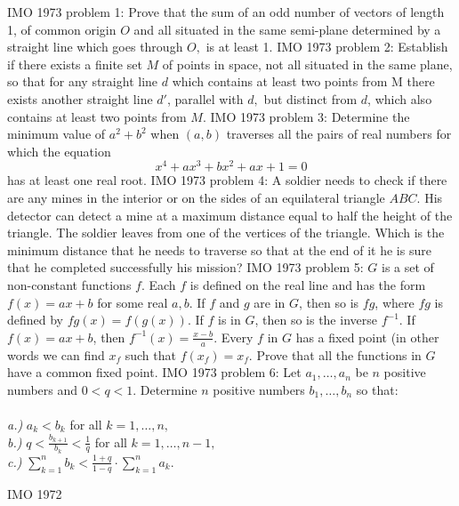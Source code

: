 IMO 1973 problem 1:  Prove that the sum of an odd number of vectors of length 1, of common origin $O$ and all situated in the same semi-plane determined by a straight line which goes through $O,$ is at least 1. 
IMO 1973 problem 2:  Establish if there exists a finite set $M$ of points in space, not all situated in the same plane, so that for any straight line $d$ which contains at least two points from M there exists another straight line $d'$, parallel with $d,$ but distinct from $d$, which also contains at least two points from $M$. 
IMO 1973 problem 3:  Determine the minimum value of $a^2 + b^2$ when $(a,b)$ traverses all the pairs of real numbers for which the equation
\[ x^4 + ax^3 + bx^2 + ax + 1 = 0 \]
has at least one real root. 
IMO 1973 problem 4:  A soldier needs to check if there are any mines in the interior or on the sides of an equilateral triangle $ABC.$ His detector can detect a mine at a maximum distance equal to half the height of the triangle. The soldier leaves from one of the vertices of the triangle. Which is the minimum distance that he needs to traverse so that at the end of it he is sure that he completed successfully his mission? 
IMO 1973 problem 5:  $G$ is a set of non-constant functions $f$. Each $f$ is defined on the real line and has the form $f(x)=ax+b$ for some real $a,b$. If $f$ and $g$ are in $G$, then so is $fg$, where $fg$ is defined by $fg(x)=f(g(x))$. If $f$ is in $G$, then so is the inverse $f^{-1}$. If $f(x)=ax+b$, then $f^{-1}(x)= \frac{x-b}{a}$. Every $f$ in $G$ has a fixed point (in other words we can find $x_f$ such that $f(x_f)=x_f$. Prove that all the functions in $G$ have a common fixed point. 
IMO 1973 problem 6:  Let $a_1, \ldots, a_n$ be $n$ positive numbers and $0 < q < 1.$ Determine $n$ positive numbers $b_1, \ldots, b_n$ so that: \\\\
\textit{a.)} $ a_k < b_k$ for all $k = 1, \ldots, n,$ \\
\textit{b.)} $q < \frac{b_{k+1}}{b_k} < \frac{1}{q}$ for all $k = 1, \ldots, n-1,$ \\
\textit{c.)} $\sum \limits^n_{k=1} b_k < \frac{1+q}{1-q} \cdot \sum \limits^n_{k=1} a_k.$ 

IMO 1972 


